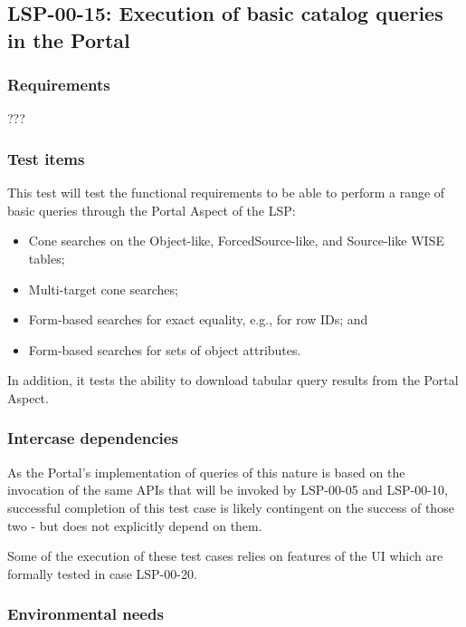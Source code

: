 \subsection{LSP-00-15: Execution of basic catalog queries in the Portal}
\label{lsp-00-15}

\subsubsection{Requirements}

???

\subsubsection{Test items}

This test will test the functional requirements to be able to perform a range of basic queries through the Portal Aspect of the LSP:

\begin{itemize}

  \item{Cone searches on the Object-like, ForcedSource-like, and Source-like WISE tables;}
  \item{Multi-target cone searches;}
  \item{Form-based searches for exact equality, e.g., for row IDs; and}
  \item{Form-based searches for sets of object attributes.}

\end{itemize}

In addition, it tests the ability to download tabular query results from the Portal Aspect.

\subsubsection{Intercase dependencies}

As the Portal's implementation of queries of this nature is based on the invocation of the same APIs that will be invoked by LSP-00-05 and LSP-00-10, successful completion of this test case is likely contingent on the success of those two - but does not explicitly depend on them.

Some of the execution of these test cases relies on features of the UI which are formally tested in case LSP-00-20.

\subsubsection{Environmental needs}

